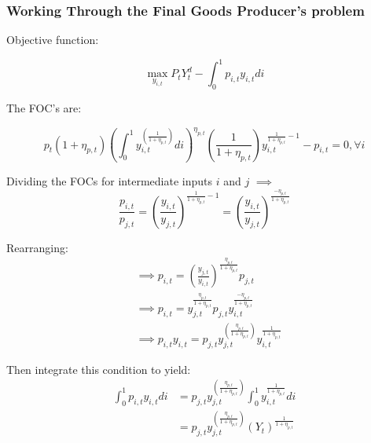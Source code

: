 \documentclass[article,11pt,letterpaper,fleqn]{article}
\theoremstyle{definition}
\numberwithin{equation}{section}
\begin{document}
\subsubsection{Working Through the Final Goods Producer's problem}

Objective function:

\begin{equation}
\max_{y_{i,t}} P_{t}Y_{t}^{d} - \int_{0}^{1}p_{i,t}y_{i,t}di
\end{equation}

The FOC's are:

\begin{equation}
p_{t}(1+\eta_{p,t})\left(\int_{0}^{1}y_{i,t}^{\left(\frac{1}{1+\eta_{p,t}}\right)}di\right)^{\eta_{p,t}}\left(\frac{1}{1+\eta_{p,t}}\right)y_{i,t}^{\frac{1}{1+\eta_{p,t}}-1}-p_{i,t} = 0, \forall i
\end{equation}

Dividing the FOCs for intermediate inputs $i$ and $j$ $\implies$
\begin{equation}
\frac{p_{i,t}}{p_{j,t}} = \left(\frac{y_{i,t}}{y_{j,t}}\right)^{\frac{1}{1+\eta_{p,t}}-1} = \left(\frac{y_{i,t}}{y_{j,t}}\right)^{\frac{-\eta_{p,t}}{1+\eta_{p,t}}}
\end{equation}

Rearranging:
\begin{equation}
\begin{split}
&\implies p_{i,t} = \left(\frac{y_{j,t}}{y_{i,t}}\right)^{\frac{\eta_{p,t}}{1+\eta_{p,t}}}p_{j,t} \\
& \implies p_{i,t} = y_{j,t}^{\frac{\eta_{p,t}}{1+\eta_{p,t}}}p_{j,t}y_{i,t}^{\frac{-\eta_{p,t}}{1+\eta_{p,t}}} \\
& \implies p_{i,t}y_{i,t} = p_{j,t}y_{j,t}^{\left(\frac{\eta_{p,t}}{1+\eta_{p,t}}\right)}y_{i,t}^{\frac{1}{1+\eta_{p,t}}}
\end{split}
\end{equation}

Then integrate this condition to yield:
\begin{equation}
\begin{split}
\int_{0}^{1}p_{i,t}y_{i,t}di & = p_{j,t}y_{j,t}^{\left(\frac{\eta_{p,t}}{1+\eta_{p,t}}\right)}\int_{0}^{1}y_{i,t}^{\frac{1}{1+\eta_{p,t}}}di  \\
& = p_{j,t}y_{j,t}^{\left(\frac{\eta_{p,t}}{1+\eta_{p,t}}\right)}(Y_{t})^{\frac{1}{1+\eta_{p,t}}} 
\end{split}
\end{equation}
\end{document}
